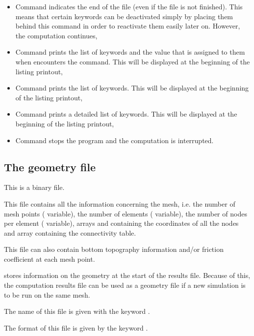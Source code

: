 \begin{itemize}
\item Command  indicates the end of the file
(even if the file is not finished).
This means that certain keywords can be deactivated simply by placing them
behind this command in order to reactivate them easily later on.
However, the computation continues,

\item Command  prints the list of keywords and the value
that is assigned to them when \damo encounters the command.
This will be displayed at the beginning of the listing printout,

\item Command  prints the list of keywords.
This will be displayed at the beginning of the listing printout,

\item Command  prints a detailed list of keywords.
This will be displayed at the beginning of the listing printout,

\item Command  stops the program and the computation is
interrupted.
\end{itemize}


\subsection{The geometry file}

This is a binary file.

This file contains all the information concerning the mesh,
i.e. the number of mesh points ( variable),
the number of elements ( variable),
the number of nodes per element ( variable),
arrays  and  containing the coordinates of all the nodes
and array  containing the connectivity table.

This file can also contain bottom topography information and/or
friction coefficient at each mesh point.

 stores information on the geometry at the start of the results file.
Because of this, the computation results file can be used as a geometry file
if a new simulation is to be run on the same mesh.

The name of this file is given with the keyword .

The format of this file is given by the keyword .


